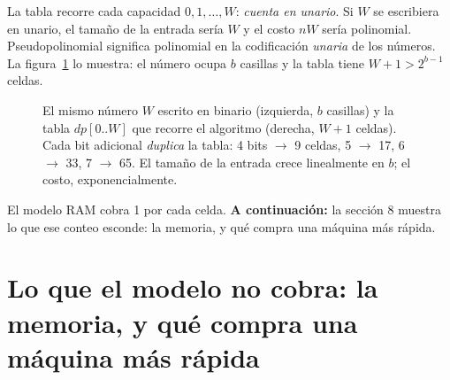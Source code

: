 \documentclass[11pt]{article}
\begin{document}
La tabla recorre cada capacidad $0,1,\dots,W$: \emph{cuenta en unario}. Si $W$ se escribiera en unario, el
tamaño de la entrada sería $W$ y el costo $nW$ sería polinomial. Pseudopolinomial significa polinomial en la
codificación \emph{unaria} de los números. La figura~\ref{fig:tabla} lo muestra: el número ocupa $b$ casillas
y la tabla tiene $W+1>2^{b-1}$ celdas.

\begin{figure}[!ht]
\centering
{}
\caption{El mismo número $W$ escrito en binario (izquierda, $b$ casillas) y la tabla $dp[0..W]$ que recorre
el algoritmo (derecha, $W+1$ celdas). Cada bit adicional \emph{duplica} la tabla: 4 bits $\to$ 9 celdas, 5
$\to$ 17, 6 $\to$ 33, 7 $\to$ 65. El tamaño de la entrada crece linealmente en $b$; el costo, exponencialmente.}
\label{fig:tabla}
\end{figure}

El modelo RAM cobra 1 por cada celda. \textbf{A continuación:} la sección 8 muestra lo que ese conteo esconde: la memoria, y qué compra una máquina más rápida.

\section{Lo que el modelo no cobra: la memoria, y qué compra una máquina más rápida}
\end{document}
